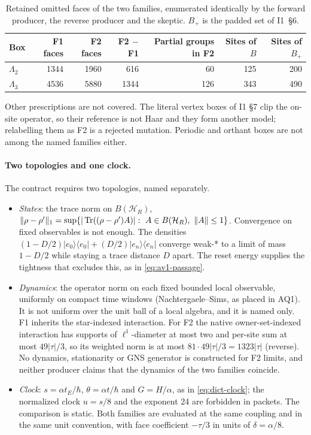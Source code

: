 \begin{table}[htbp]
\centering\small
\caption{Retained omitted faces of the two families, enumerated identically by
the forward producer, the reverse producer and the skeptic. $B_+$ is the
padded set of I1~\S6.}
\label{tab:ay1-families}
\begin{tabular}{lrrrrrr}
\toprule
Box & F1 faces & F2 faces & F2 $-$ F1 & Partial groups in F2 & Sites of $B$ & Sites of $B_+$\\
\midrule
$\Lambda_2$ & 1344 & 1960 & 616 & 60 & 125 & 200\\
$\Lambda_3$ & 4536 & 5880 & 1344 & 126 & 343 & 490\\
\bottomrule
\end{tabular}
\end{table}

Other prescriptions are not covered. The literal vertex boxes of I1 \S7 clip
the on-site operator, so their reference is not Haar and they form another
model; relabelling them as F2 is a rejected mutation. Periodic and orthant
boxes are not among the named families either.

\paragraph{Two topologies and one clock.}
The contract requires two topologies, named separately.
\begin{itemize}
\item \emph{States}: the trace norm on $B(\mathcal H_R)$,
 $\lVert \rho-\rho'\rVert_1=\sup\{|\operatorname{Tr}((\rho-\rho')A)|:\ A\in B(\mathcal H_R),\
 \lVert A\rVert \le1\}$. Convergence on fixed observables is not enough. The
 densities $(1-D/2)|e_0\rangle\langle e_0|+(D/2)|e_n\rangle\langle e_n|$
 converge weak-* to a limit of mass $1-D/2$ while staying a trace distance
 $D$ apart. The reset energy supplies the tightness that excludes this, as in
 \eqref{eq:av1-passage}.
\item \emph{Dynamics}: the operator norm on each fixed bounded local
 observable, uniformly on compact time windows (Nachtergaele--Sims, as placed
 in AQ1). It is not uniform over the unit ball of a local algebra, and it is
 named only. F1 inherits the star-indexed interaction. For F2 the native
 owner-set-indexed interaction has supports of $\ell^1$-diameter at most two
 and per-site sum at most $49|\tau|/3$, so its weighted norm is at most
 $81\cdot49|\tau|/3=1323|\tau|$ (reverse). No dynamics, stationarity or GNS
 generator is constructed for F2 limits, and neither producer claims that the
 dynamics of the two families coincide.
\item \emph{Clock}: $s=\alpha t_E/\hbar$, $\theta=\alpha t/\hbar$ and
 $G=H/\alpha$, as in \eqref{eq:dict-clock}; the normalized clock $u=s/8$ and
 the exponent 24 are forbidden in packets. The comparison is static. Both
 families are evaluated at the same coupling and in the same unit convention,
 with face coefficient $-\tau/3$ in units of $\delta=\alpha/8$.
\end{itemize}


